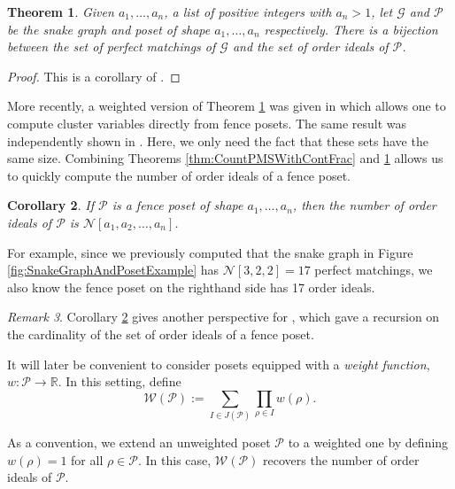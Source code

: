 \documentclass[12pt, letterpaper,table]{amsart}
\newtheorem{theorem}{Theorem}
\newtheorem{cor}[theorem]{Corollary}
\theoremstyle{remark}
\newtheorem{remark}[theorem]{Remark}
\newcommand{\calP}{\mathcal{P}}
\begin{document}
\begin{theorem}\label{thm:SnakeGraphAndFencePoset}
Given $a_1,\ldots,a_n$, a list of positive integers with $a_n > 1$, let $\mathcal{G}$ and $\calP$ be the snake graph and poset of shape $a_1,\ldots,a_n$ respectively. There is a bijection between the set of perfect matchings of $\mathcal{G}$ and the set of order ideals of $\calP$.
\end{theorem}

\begin{proof}
This is a corollary of \cite[Theorem 5.4]{musiker2013bases}.
\end{proof}

More recently, a weighted version of Theorem \ref{thm:SnakeGraphAndFencePoset} was given in \cite{ezgieminecluster2024} which allows one to compute cluster variables directly from fence posets. The same result was independently shown in \cite{pilaud2023posets}. Here, we only need the fact that these sets have the same size. Combining Theorems \ref{thm:CountPMSWithContFrac} and \ref{thm:SnakeGraphAndFencePoset} allows us to quickly compute the number of order ideals of a fence poset.

\begin{cor}\label{cor:CountOrderIdeals}
If $\calP$ is a fence poset of shape $a_1,\ldots,a_n$, then the number of order ideals of $\calP$ is $\mathcal{N}[a_1,a_2,\ldots,a_n]$.
\end{cor}

For example, since we previously computed that the snake graph in Figure \ref{fig:SnakeGraphAndPosetExample} has $\mathcal{N}[3,2,2] = 17$ perfect matchings, we also know the fence poset on the righthand side has 17 order ideals.

\begin{remark}
 Corollary \ref{cor:CountOrderIdeals} gives another perspective for  \cite[Lemma 2]{elizalde2021rowmotion}, which gave a recursion on the cardinality of the set of order ideals of a fence poset.
 \end{remark}

It will later be convenient to consider posets equipped with a \emph{weight function}, $w: \calP \to \mathbb{R}$. In this setting,  define \[
\mathcal{W}(\calP) := \sum_{I \in J(\calP)} \prod_{\rho \in I} w(\rho).
\]

As a convention, we extend an unweighted poset $\calP$ to a weighted one by defining $w(\rho) = 1$ for all $\rho \in \calP$. In this case, $\mathcal{W}(\calP)$ recovers the number of order ideals of $\calP$.
\end{document}
